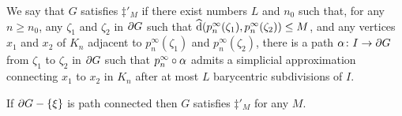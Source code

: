 \documentclass[a4paper]{article}
\begin{document}
\begin{definition}
  We say that $G$ satisfies $\ddag'_M$ if there exist numbers $L$ and $n_0$ such that,
  for any $n \geq n_0$, any $\zeta_1$ and $\zeta_2$ in $\partial G$
  such that $\operatorname{\widehat{d}}(p^\infty_n(\zeta_1), p^\infty_n(\zeta_2)) \leq M$, and
  any vertices $x_1$ and $x_2$ of $K_n$ adjacent to $p^\infty_n(\zeta_1)$ and
  $p^\infty_n(\zeta_2)$, there is a path $\alpha\colon I\to \partial G$ from
  $\zeta_1$ to $\zeta_2$ in $\partial G$ such that $p^\infty_n\circ\alpha$
  admits a simplicial approximation connecting $x_1$ to $x_2$ in $K_n$ after at
  most $L$ barycentric subdivisions of $I$.
\end{definition}

\begin{proposition}
  If $\partial G - \left\{\xi\right\}$ is path connected then $G$ satisfies $\ddag'_M$
  for any $M$.
\end{proposition}
\end{document}
